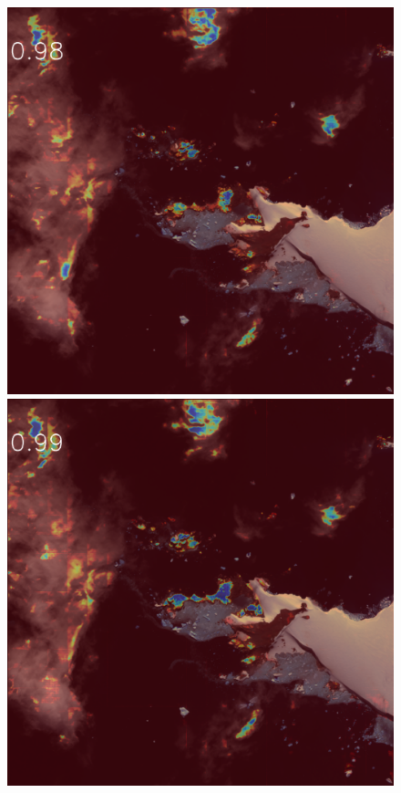 \begin{figure}[h]
\includegraphics[width=\subFigx]{./fig/datagrow/MSE_single_unet_train_0_3.txt_bias-1_bs128_do0.1e25/orthoQB02_11JAN121245196-M1BS-101001000CD66D00_u08rfAEAC.png}
\includegraphics[width=\subFigx]{./fig/datagrow/MSE_single_unet_train_0_4.txt_bias-1_bs128_do0.1e25/orthoQB02_11JAN121245196-M1BS-101001000CD66D00_u08rfAEAC.png}



\end{figure}
